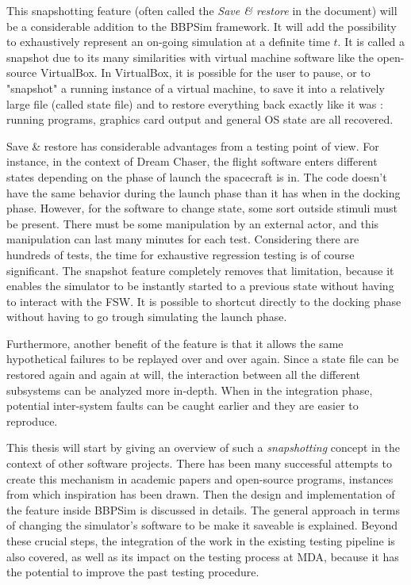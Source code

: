 {This snapshotting feature (often called the \textit{Save \& restore} in the document) will be a considerable addition to the \gls{BBPSim} framework. It will add the possibility to exhaustively represent an on-going simulation at a definite time $t$. It is called a snapshot due to its many similarities with virtual machine software like the open-source VirtualBox. In VirtualBox, it is possible for the user to pause, or to "snapshot" a running instance of a virtual machine, to save it into a relatively large file (called state file) and to restore everything back exactly like it was : running programs, graphics card output and general OS state are all recovered.  

Save \& restore has considerable advantages from a testing point of view. For instance, in the context of Dream Chaser, the flight software enters different states depending on the phase of launch the spacecraft is in. The code doesn't have the same behavior during the launch phase than it has when in the docking phase. However, for the software to change state, some sort outside stimuli must be present. There must be some manipulation by an external actor, and this manipulation can last many minutes for each test. Considering there are hundreds of tests, the time for exhaustive regression testing is of course significant. The snapshot feature completely removes that limitation, because it enables the simulator to be instantly started to a previous state without having to interact with the \gls{FSW}. It is possible to shortcut directly to the docking phase without having to go trough simulating the launch phase. 

Furthermore, another benefit of the feature is that it allows the same hypothetical failures to be replayed over and over again. Since a state file can be restored again and again at will, the interaction between all the different subsystems can be analyzed more in-depth. When in the integration phase, potential inter-system faults can be caught earlier and they are easier to reproduce.  

This thesis will start by giving an overview of such a \textit{snapshotting} concept in the context of other software projects. There has been many successful attempts to create this mechanism in academic papers and open-source programs, instances from which inspiration has been drawn. Then the design and implementation of the feature inside \gls{BBPSim} is discussed in details. The general approach in terms of changing the simulator's software to be make it saveable is explained. Beyond these crucial steps, the integration of the work in the existing testing pipeline is also covered, as well as its impact on the testing process at MDA, because it has the potential to improve the past testing procedure.


}